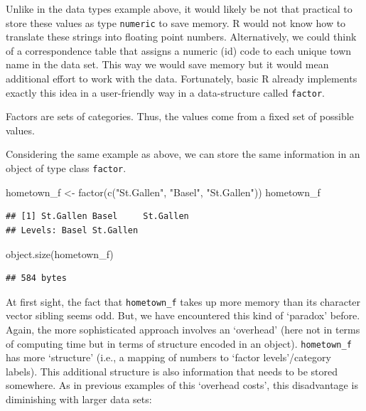 \documentclass[
  12pt,
]{style/krantz}
\newenvironment{Shaded}{\begin{snugshade}}{\end{snugshade}}
\newcommand{\FunctionTok}[1]{\textcolor[rgb]{0.00,0.00,0.00}{#1}}
\newcommand{\NormalTok}[1]{#1}
\newcommand{\OtherTok}[1]{\textcolor[rgb]{0.56,0.35,0.01}{#1}}
\newcommand{\StringTok}[1]{\textcolor[rgb]{0.31,0.60,0.02}{#1}}
\begin{document}
Unlike in the data types example above, it would likely be not that practical to store these values as type \texttt{numeric} to save memory. R would not know how to translate these strings into floating point numbers. Alternatively, we could think of a correspondence table that assigns a numeric (id) code to each unique town name in the data set. This way we would save memory but it would mean additional effort to work with the data. Fortunately, basic R already implements exactly this idea in a user-friendly way in a data-structure called \texttt{factor}.

Factors are sets of categories. Thus, the values come from a fixed set of possible values.

Considering the same example as above, we can store the same information in an object of type class \texttt{factor}.

\begin{Shaded}
\begin{Highlighting}[]
\NormalTok{hometown\_f }\OtherTok{\textless{}{-}} \FunctionTok{factor}\NormalTok{(}\FunctionTok{c}\NormalTok{(}\StringTok{"St.Gallen"}\NormalTok{, }\StringTok{"Basel"}\NormalTok{, }\StringTok{"St.Gallen"}\NormalTok{))}
\NormalTok{hometown\_f}
\end{Highlighting}
\end{Shaded}

\begin{verbatim}
## [1] St.Gallen Basel     St.Gallen
## Levels: Basel St.Gallen
\end{verbatim}

\begin{Shaded}
\begin{Highlighting}[]
\FunctionTok{object.size}\NormalTok{(hometown\_f)}
\end{Highlighting}
\end{Shaded}

\begin{verbatim}
## 584 bytes
\end{verbatim}

At first sight, the fact that \texttt{hometown\_f} takes up more memory than its character vector sibling seems odd. But, we have encountered this kind of `paradox' before. Again, the more sophisticated approach involves an `overhead' (here not in terms of computing time but in terms of structure encoded in an object). \texttt{hometown\_f} has more `structure' (i.e., a mapping of numbers to `factor levels'/category labels). This additional structure is also information that needs to be stored somewhere. As in previous examples of this `overhead costs', this disadvantage is diminishing with larger data sets:
\end{document}
